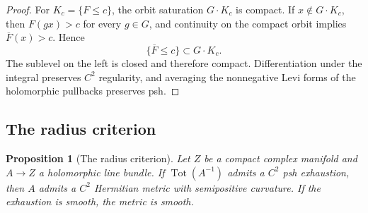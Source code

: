 \documentclass[11pt]{amsart}
\newtheorem{proposition}[theorem]{Proposition}
\theoremstyle{definition}
\theoremstyle{remark}
\numberwithin{equation}{section}
\newcommand{\Tot}{\operatorname{Tot}}
\begin{document}
\begin{proof}
For $K_c=\{F\le c\}$, the orbit saturation $G\cdot K_c$ is compact.
If $x\notin G\cdot K_c$, then $F(gx)>c$ for every $g\in G$, and
continuity on the compact orbit implies $\overline F(x)>c$. Hence
\[
 \{\overline F\le c\}\subset G\cdot K_c.
\]
The sublevel on the left is closed and therefore compact. Differentiation
under the integral preserves $C^2$ regularity, and averaging the
nonnegative Levi forms of the holomorphic pullbacks preserves psh.
\end{proof}

\subsection{The radius criterion}

\begin{proposition}[The radius criterion]\label{prop:radius}
Let $Z$ be a compact complex manifold and $A\to Z$ a holomorphic line
bundle. If $\Tot(A^{-1})$ admits a $C^2$ psh exhaustion, then $A$ admits
a $C^2$ Hermitian metric with semipositive curvature. If the exhaustion
is smooth, the metric is smooth.
\end{proposition}
\end{document}
